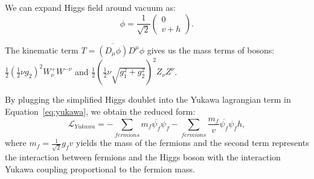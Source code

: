 \par We can expand Higgs field around vacuum as:
\begin{equation}
 \phi=\frac{1}{\sqrt{2}}\left( \begin{smallmatrix} 0\\v + h \end{smallmatrix}\right).
\end{equation}


\par The kinematic term $T=\overline{\left(D_\mu\phi\right)}D^\mu\phi $ gives us the mass terms of bosons:
 $\frac{1}{2}(\frac{1}{2}\nu g_2)^2 W_\nu^+ W^{-\nu}$ and $\frac{1}{2}(\frac{1}{2}\nu \sqrt{g_1^2+g_2^2})^2 Z_\nu Z^\nu$.\\


\par By plugging the simplified Higgs doublet into the Yukawa lagrangian term in Equation~\ref{eq:yukawa}, we obtain the reduced form:
\begin{equation}
 \mathcal{L}_{Yukawa} = - \sum_{fermions} m_f \overline{\psi_f}\psi_f - \sum_{fermions} \frac{m_f}{v} \overline{\psi_f}\psi_f h,
 \label{eq:vac}
\end{equation}
where $m_f=\frac{1}{\sqrt{2}} g_f v $ yields the mass of the fermions and the second term represents the interaction between fermions and the Higgs boson with the interaction Yukawa coupling proportional to the fermion mass.


